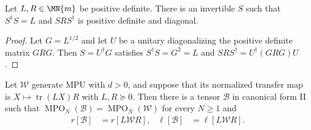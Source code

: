 \begin{lemma}
    \label{lem:mpu_posdef_congruence_diagonal}
    \leanok
    Let $L,R\in\MN{m}$ be positive definite. There is an invertible $S$ such
    that $S^\dagger S=L$ and $SRS^\dagger$ is positive definite and diagonal.
\end{lemma}

\begin{proof}\leanok
    Let $G=L^{1/2}$ and let $U$ be a unitary diagonalizing the positive
    definite matrix $GRG$. Then $S=U^\dagger G$ satisfies
    $S^\dagger S=G^2=L$ and $SRS^\dagger=U^\dagger(GRG)U$.
\end{proof}

\begin{lemma}
    \label{lem:mpu_rank_one_transfer_canonical_form}
    \leanok
    Let $\mathcal W$ generate MPU with $d>0$, and suppose that its normalized
    transfer map is $X\mapsto\operatorname{tr}(LX)R$ with $L,R\succeq0$. Then
    there is a tensor $\mathcal B$ in canonical form II such that
    $\operatorname{MPO}_N(\mathcal B)=\operatorname{MPO}_N(\mathcal W)$ for
    every $N\geq1$ and
    \begin{align}
        r[\mathcal B]    & =r[L\mathcal WR],    &
        \ell[\mathcal B] & =\ell[L\mathcal WR].
    \end{align}
\end{lemma}

